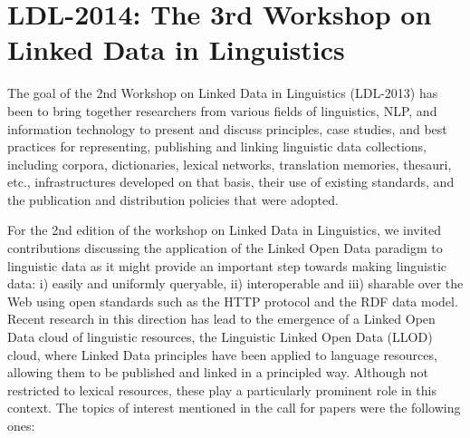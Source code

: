 \section{LDL-2014: The 3rd Workshop on Linked Data in Linguistics}

The goal of the 2nd Workshop on Linked Data in Linguistics (LDL-2013) has been to bring together researchers from various fields of linguistics, NLP, and information technology to present and discuss principles, case studies, and best practices for representing, publishing and linking linguistic data collections, including corpora, dictionaries, lexical networks, translation memories, thesauri, etc., infrastructures developed on that basis, their use of existing standards, and the publication and distribution policies that were adopted.


For the 2nd edition of the workshop on Linked Data in Linguistics, we invited contributions discussing the application of the Linked Open Data paradigm to linguistic data as it might provide an important step towards making linguistic data: i) easily and uniformly queryable, ii) interoperable and iii) sharable over the Web using open standards such as the HTTP protocol and the RDF data model. Recent research in this direction has lead to the emergence of a Linked Open Data cloud of linguistic resources, the Linguistic Linked Open Data (LLOD) cloud, where Linked Data principles have been applied to language resources, allowing them to be published and linked in a principled way. Although not restricted to lexical resources, these play a particularly prominent role in this context.
The topics of interest mentioned in the call for papers were the following ones:

